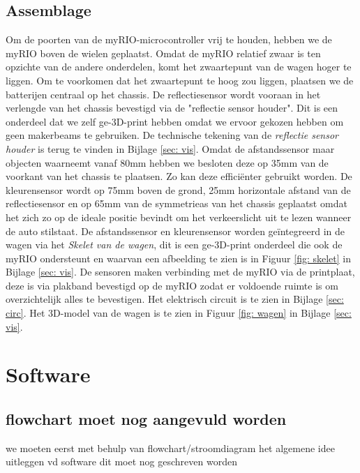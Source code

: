 \documentclass[a4paper,twoside,kulak]{kulakreport}
\begin{document}
	\subsection{Assemblage}
 Om de poorten van de myRIO-microcontroller vrij te houden, hebben we de myRIO boven de wielen geplaatst. Omdat de myRIO relatief zwaar is ten opzichte van de andere onderdelen, komt het zwaartepunt van de wagen hoger te liggen. Om te voorkomen dat het zwaartepunt te hoog zou liggen, plaatsen we de batterijen centraal op het chassis. De reflectiesensor wordt vooraan in het verlengde van het chassis bevestigd via de "reflectie sensor houder". Dit is een onderdeel dat we zelf ge-3D-print hebben omdat we ervoor gekozen hebben om geen makerbeams te gebruiken. De technische tekening van de \textit{reflectie sensor houder} is terug te vinden in Bijlage \ref{sec: vis}. Omdat de afstandssensor maar objecten waarneemt vanaf 80mm hebben we besloten deze op 35mm van de voorkant van het chassis te plaatsen. Zo kan deze efficiënter gebruikt worden. De kleurensensor wordt op 75mm boven de grond, 25mm horizontale afstand van de reflectiesensor en op 65mm van de symmetrieas van het chassis geplaatst omdat het zich zo op de ideale positie bevindt om het verkeerslicht uit te lezen wanneer de auto stilstaat. De afstandssensor en kleurensensor worden geïntegreerd in de wagen via het \textit{Skelet van de wagen}, dit is een ge-3D-print onderdeel die ook de myRIO ondersteunt en waarvan een afbeelding te zien is in Figuur \ref{fig: skelet} in Bijlage \ref{sec: vis}. De sensoren maken verbinding met de myRIO via de printplaat, deze is via plakband bevestigd op de myRIO zodat er voldoende ruimte is om overzichtelijk alles te bevestigen. Het elektrisch circuit is te zien in Bijlage \ref{sec: circ}. Het 3D-model van de wagen is te zien in Figuur \ref{fig: wagen} in Bijlage \ref{sec: vis}.
	
\section{Software}

\subsection{flowchart moet nog aangevuld worden}

we moeten eerst met behulp van flowchart/stroomdiagram het algemene idee uitleggen vd software
dit moet nog geschreven worden
\end{document}
